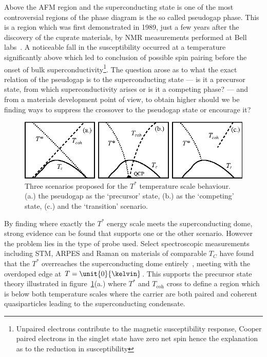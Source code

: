 Above the \ac{AFM} region and the superconducting state is one of the most controversial regions of the phase diagram is the so called pseudogap phase. This is a region which was first demonstrated in 1989, just a few years after the discovery of the cuprate materials, by \ac{NMR} measurements performed at Bell labs~\cite{Warren1989}. A noticeable fall in the susceptibility occurred at a temperature significantly above \Tc which led to conclusion of possible spin pairing before the onset of bulk superconductivity\footnote{Unpaired electrons contribute to the magnetic susceptibility response, Cooper paired electrons in the singlet state have zero net spin hence the explanation as to the reduction in susceptibility}. The question arose as to what the exact relation of the pseudogap is to the superconducting state --- is it a precursor state, from which superconductivity arises or is it a competing phase? --- and from a materials development point of view, to obtain higher \Tc should we be finding ways to suppress the crossover to the pseudogap state or encourage it?
\begin{figure}[htbp]
    \begin{center}
        \includegraphics[scale=0.9]{Chapter-Introduction/Figures/PGScenarios/PGScenarios}
        \caption{Three scenarios proposed for the $T^*$ temperature scale behaviour. (a.) the pseudogap as the `precursor' state, (b.) as the `competing' state, (c.) and the `transition' scenario.}
        \label{Fig:Intro:PGScenario}
    \end{center}
\end{figure}
By finding where exactly the $T^*$ energy scale meets the superconducting dome, strong evidence can be found that supports one or the other scenario. However the problem lies in the type of probe used. Select spectroscopic measurements including \ac{STM}, \ac{ARPES} and Raman on materials of comparable $T_C$ have found that the $T^*$ overreaches the superconducting dome entirely~\cite{Hufner2008}, meeting with the overdoped edge at $T=\unit{0}{\kelvin}$. This supports the precursor state theory illustrated in figure~\ref{Fig:Intro:PGScenario}(a.) where $T^*$ and $T_{\textrm{coh}}$ cross to define a region which is below both temperature scales where the carrier are both paired and coherent quasiparticles leading to the superconducting condensate.

